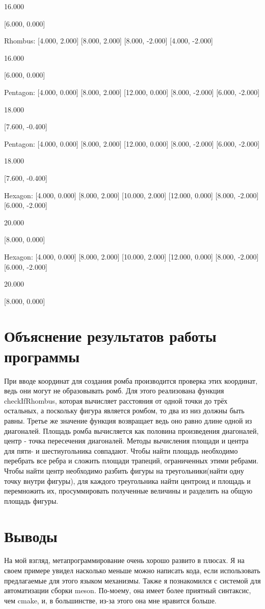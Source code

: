 \documentclass[a4paper, 12pt]{article}
\begin{document}
16.000

[6.000, 0.000]

Rhombus: [4.000, 2.000] [8.000, 2.000] [8.000, -2.000] [4.000, -2.000] 

16.000

[6.000, 0.000]

Pentagon: [4.000, 0.000] [8.000, 2.000] [12.000, 0.000] [8.000, -2.000] [6.000, -2.000] 

18.000

[7.600, -0.400]

Pentagon: [4.000, 0.000] [8.000, 2.000] [12.000, 0.000] [8.000, -2.000] [6.000, -2.000] 

18.000

[7.600, -0.400]

Hexagon: [4.000, 0.000] [8.000, 2.000] [10.000, 2.000] [12.000, 0.000] [8.000, -2.000] [6.000, -2.000] 

20.000

[8.000, 0.000]

Hexagon: [4.000, 0.000] [8.000, 2.000] [10.000, 2.000] [12.000, 0.000] [8.000, -2.000] [6.000, -2.000] 

20.000

[8.000, 0.000]

\newpage

\section{Объяснение результатов работы программы}

При вводе координат для создания ромба производится проверка этих координат, ведь они могут не образовывать ромб. Для этого реализована функция checkIfRhombus, которая вычисляет расстояния от одной точки до трёх остальных, а поскольку фигура является ромбом, то два из низ должны быть равны. Третье же значение функция возвращает ведь оно равно длине одной из диагоналей. Площадь ромба вычисляется как половина произведения диагоналей, центр - точка пересечения диагоналей. Методы вычисления площади и центра для пяти- и шестиугольника совпадают. Чтобы найти площадь необходимо перебрать все ребра и сложить площади трапеций, ограниченных этими ребрами. Чтобы найти центр необходимо разбить фигуры на треугольники(найти одну точку внутри фигуры), для каждого треугольника найти центроид и площадь и перемножить их, просуммировать полученные величины и разделить на общую площадь фигуры.   

\newpage
\section{Выводы}

На мой взгляд, метапрограммирование очень хорошо развито в плюсах. Я на своем примере увидел насколько меньше можно написать кода, если использовать предлагаемые для этого языком механизмы. Также я познакомился с системой для автоматизации сборки meson. По-моему, она имеет более приятный синтаксис, чем cmake, и, в большинстве, из-за этого она мне нравится больше.
\end{document}

